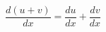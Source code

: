 \documentclass[12pt]{article}
\begin{document}
\sicpsize
\[
\frac{d(u + v)}{dx} = \frac{du}{dx} + \frac{dv}{dx}
\]
\end{document}
